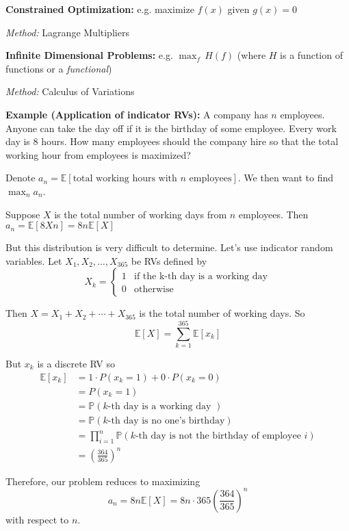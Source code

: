 \documentclass[12pt]{article}
\renewcommand{\P}{\mathbb{P}}
\newcommand{\E}{\mathbb{E}}
\begin{document}
        \textbf{Constrained Optimization:} e.g. maximize $f(x)$ given $g(x) = 0$

        \emph{Method:} Lagrange Multipliers 

        \textbf{Infinite Dimensional Problems:} e.g. $\max_f \, H(f)$ (where $H$ is a function of functions or a \emph{functional})

        \emph{Method:} Calculus of Variations
    
        \textbf{Example (Application of indicator RVs):} A company has $n$ employees. Anyone can take the day off if it is the birthday of some employee. Every work day is 8 hours. How many employees should the company hire so that the total working hour from employees is maximized? 
        
        Denote $a_n = \E[\text{total working hours with } n \text{ employees}]$. We then want to find $\max_n a_n$.

        Suppose $X$ is the total number of working days from $n$ employees. Then $a_n = \E[8Xn] = 8n\E[X]$

        But this distribution is very difficult to determine. Let's use indicator random variables. Let $X_{1}, X_2, \dots, X_{365}$ be RVs defined by 
        \[X_k = \begin{cases}
            1 & \text{if the k-th day is a working day}\\ 
            0 & \text{otherwise}
        \end{cases}\] 

        Then $X = X_1 + X_2 + \cdots + X_{365}$ is the total number of working days. So 
        \[\E[X] = \sum_{k=1}^{365} \E[x_k]\]

        But $x_k$ is a discrete RV so 
        \begin{align*}
            \E[x_k] &= 1 \cdot P(x_k = 1) + 0 \cdot P(x_k = 0)\\ 
            &= P(x_k = 1)\\ 
            &= \P(k \text{-th day is a working day })\\ 
            &= \P(k \text{-th day is no one's birthday})\\ 
            &= \prod_{i=1}^n \P(k \text{-th day is not the birthday of employee } i)\\
            &= \left(\frac{364}{365}\right)^n 
        \end{align*}

        Therefore, our problem reduces to maximizing 
        \[a_n = 8n \E[X] = 8n \cdot 365 \left(\frac{364}{365}\right)^n\]
        with respect to $n$.
\end{document}

